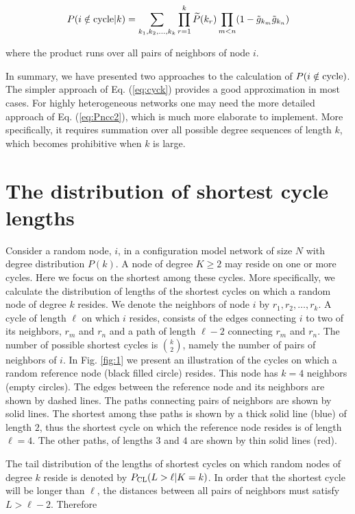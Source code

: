 \documentclass[preprint,pre,superscriptaddress,showpacs]{revtex4}
\begin{document}
\begin{equation}
P(i \notin {\rm cycle} | k) = 
\sum_{k_1,k_2,\dots,k_k}
\prod_{r=1}^k
\widetilde P(k_r)
\prod_{m < n} 
(1 - {\tilde g}_{k_m} {\tilde g}_{k_n})
\label{eq:Pncc2}
\end{equation}

\noindent
where 
the product runs over all pairs of neighbors of node $i$.

In summary, we have presented two approaches to the calculation
of $P(i \notin {\rm cycle})$.
The simpler approach of Eq. (\ref{eq:cyck})
provides a good approximation in most cases.
For highly heterogeneous networks one may need the more
detailed approach of Eq. (\ref{eq:Pncc2}),
which is much more elaborate to implement.
More specifically, it requires summation over all possible
degree sequences of length $k$, which becomes prohibitive
when $k$ is large.


\section{The distribution of shortest cycle lengths}

Consider a random node, $i$, in a configuration model 
network of size $N$ with degree 
distribution $P(k)$. 
A node of degree $K \ge 2$ may reside on one or more cycles.
Here we focus on the shortest among these cycles.
More specifically, we calculate the distribution of lengths of
the shortest cycles on which a random node of degree $k$ resides.
We denote the neighbors of node $i$ by $r_1,r_2,\dots,r_k$.
A cycle of length $\ell$ on which $i$ resides, consists of the edges connecting
$i$ to two of its neighbors, $r_m$ and $r_n$ and a path of length $\ell-2$
connecting $r_m$ and $r_n$. The number of possible shortest 
cycles is $\binom{k}{2}$,
namely the number of pairs of neighbors of $i$.
In Fig. \ref{fig:1} we present an illustration of the cycles on
which a random reference node (black filled circle) resides. This node
has $k=4$ neighbors (empty circles). The edges between the reference
node and its neighbors are shown by dashed lines. The paths connecting
pairs of neighbors are shown by solid lines. The shortest among thse paths
is shown by a thick solid line (blue) of length $2$, thus the
shortest cycle on which the reference node resides is of length $\ell=4$. The other paths,
of lengths $3$ and $4$ are shown by thin solid lines (red).

The tail distribution of the lengths of shortest cycles on which random nodes of degree
$k$ reside is denoted by $P_{\rm CL}(L>\ell |K= k)$.
In order that the shortest cycle will be longer than $\ell$, the distances
between all pairs of neighbors must satisfy $L > \ell-2$.
Therefore
\end{document}
